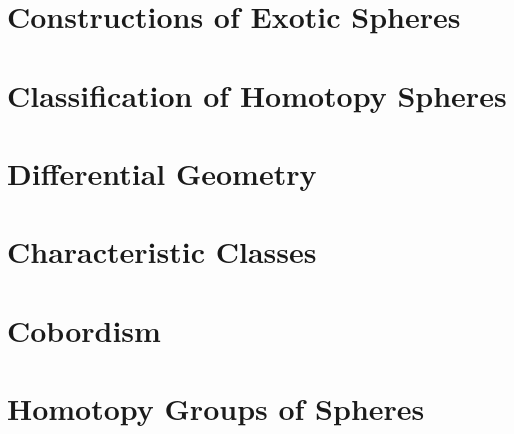 \documentclass{lkx_thesis}
\begin{document}
\chapter{Constructions of Exotic Spheres}\label{chap:construction}


\chapter{Classification of Homotopy Spheres}\label{chap:classification}


\begin{appendices}
	\chapter{Differential Geometry}\label{chap:differential_geometry}
	

	\chapter{Characteristic Classes}\label{chap:characteristic_classes}
	

	\chapter{Cobordism}\label{chap:cobordism}
	


	\chapter{Homotopy Groups of Spheres}\label{chap:homotopy_groups_of_spheres}
	
\end{appendices}

\lkxrefs
\lkxindex
\end{document}
